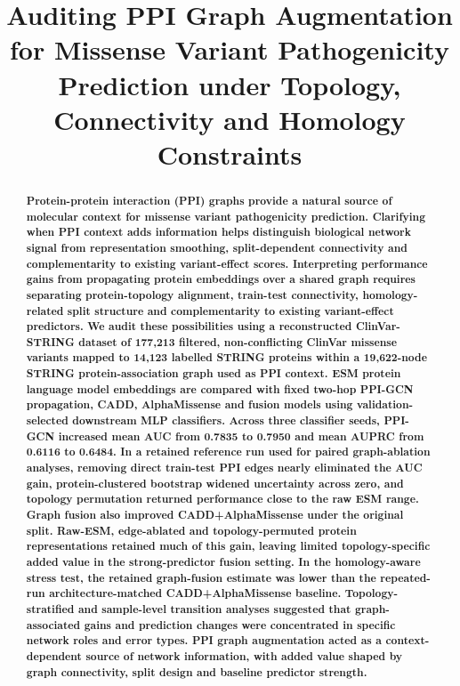 \documentclass[conference]{IEEEtran}
\title{Auditing PPI Graph Augmentation for Missense Variant Pathogenicity Prediction under Topology, Connectivity and Homology Constraints}
\author{}
\newcommand{\CADDAM}{CADD\allowbreak{}+\allowbreak{}AlphaMissense}
\begin{document}
\maketitle


\begin{abstract}
\bfseries\boldmath
Protein-protein interaction (PPI) graphs provide a natural source of molecular context for missense variant pathogenicity prediction. Clarifying when PPI context adds information helps distinguish biological network signal from representation smoothing, split-dependent connectivity and complementarity to existing variant-effect scores. Interpreting performance gains from propagating protein embeddings over a shared graph requires separating protein-topology alignment, train-test connectivity, homology-related split structure and complementarity to existing variant-effect predictors. We audit these possibilities using a reconstructed ClinVar-STRING dataset of 177,213 filtered, non-conflicting ClinVar missense variants mapped to 14,123 labelled STRING proteins within a 19,622-node STRING protein-association graph used as PPI context. ESM protein language model embeddings are compared with fixed two-hop PPI-GCN propagation, CADD, AlphaMissense and fusion models using validation-selected downstream MLP classifiers. Across three classifier seeds, PPI-GCN increased mean AUC from 0.7835 to 0.7950 and mean AUPRC from 0.6116 to 0.6484. In a retained reference run used for paired graph-ablation analyses, removing direct train-test PPI edges nearly eliminated the AUC gain, protein-clustered bootstrap widened uncertainty across zero, and topology permutation returned performance close to the raw ESM range. Graph fusion also improved \CADDAM{} under the original split. Raw-ESM, edge-ablated and topology-permuted protein representations retained much of this gain, leaving limited topology-specific added value in the strong-predictor fusion setting. In the homology-aware stress test, the retained graph-fusion estimate was lower than the repeated-run architecture-matched \CADDAM{} baseline. Topology-stratified and sample-level transition analyses suggested that graph-associated gains and prediction changes were concentrated in specific network roles and error types. PPI graph augmentation acted as a context-dependent source of network information, with added value shaped by graph connectivity, split design and baseline predictor strength.

\end{abstract}
\end{document}
